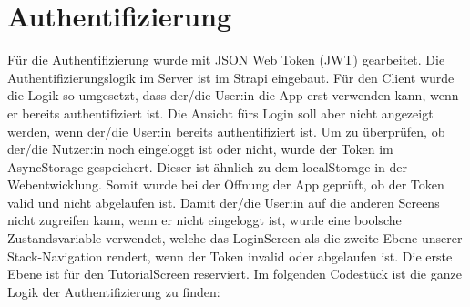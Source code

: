 \section{Authentifizierung}
Für die Authentifizierung wurde mit JSON Web Token (JWT) gearbeitet. Die Authentifizierungslogik im Server ist im Strapi eingebaut. Für den Client wurde die Logik so umgesetzt, dass der/die User:in die App erst verwenden kann, wenn er bereits authentifiziert ist.
Die Ansicht fürs Login soll aber nicht angezeigt werden, wenn der/die User:in bereits authentifiziert ist.
Um zu überprüfen, ob der/die Nutzer:in noch eingeloggt ist oder nicht, wurde der Token im AsyncStorage gespeichert. Dieser ist ähnlich zu dem localStorage in der Webentwicklung. Somit wurde bei der Öffnung der App geprüft, ob der Token valid und nicht abgelaufen ist.
Damit der/die User:in auf die anderen Screens nicht zugreifen kann, wenn er nicht eingeloggt ist, wurde eine boolsche Zustandsvariable verwendet, welche das LoginScreen als die zweite Ebene unserer Stack-Navigation rendert, wenn der Token invalid oder abgelaufen ist. Die erste Ebene ist für den TutorialScreen reserviert.
Im folgenden Codestück ist die ganze Logik der Authentifizierung zu finden:
